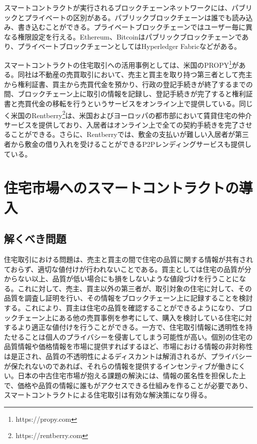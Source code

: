 \documentclass[a4paper,fontsize=11pt,report,notitlepage,line_length=38zw,number_of_lines=40]{jlreq}
\begin{document}
スマートコントラクトが実行されるブロックチェーンネットワークには、パブリックとプライベートの区別がある。パブリックブロックチェーンは誰でも読み込み、書き込むことができる。プライベートブロックチェーンではユーザー毎に異なる権限設定を行える。Ethereum、Bitcoinはパブリックブロックチェーンであり、プライベートブロックチェーンとしてはHyperledger Fabricなどがある。


スマートコントラクトの住宅取引への活用事例としては、米国のPROPY\footnote{https://propy.com}がある。同社は不動産の売買取引において、売主と買主を取り持つ第三者として売主から権利証書、買主から売買代金を預かり、行政の登記手続きが終了するまでの間、ブロックチェーン上に取引の情報を記録し、登記手続きが完了すると権利証書と売買代金の移転を行うというサービスをオンライン上で提供している。同じく米国のRentberry\footnote{https://rentberry.com}は、米国およびヨーロッパの都市部において賃貸住宅の仲介サービスを提供しており、入居者はオンライン上で全ての契約手続きを完了させることができる。さらに、Rentberryでは、敷金の支払いが難しい入居者が第三者から敷金の借り入れを受けることができるP2Pレンディングサービスも提供している。


\chapter{住宅市場へのスマートコントラクトの導入}
\section{解くべき問題}
住宅取引における問題は、売主と買主の間で住宅の品質に関する情報が共有されておらず、適切な値付けが行われないことである。買主としては住宅の品質が分からない以上、品質が低い場合にも損をしないような値段づけを行うことになる。これに対して、売主、買主以外の第三者が、取引対象の住宅に対して、その品質を調査し証明を行い、その情報をブロックチェーン上に記録することを検討する。これにより、買主は住宅の品質を確認することができるようになり、ブロックチェーン上にある他の売買事例を参考にして、購入を検討している住宅に対するより適正な値付けを行うことができる。一方で、住宅取引情報に透明性を持たせることは個人のプライバシーを侵害してしまう可能性が高い。個別の住宅の品質情報や価格情報を市場に提供すればするほど、市場における情報の非対称性は是正され、品質の不透明性によるディスカントは解消されるが、プライバシーが保たれないのであれば、それらの情報を提供するインセンティブが働きにくい。日本の中古住宅市場が抱える課題の解決には、情報の匿名性を担保した上で、価格や品質の情報に誰もがアクセスできる仕組みを作ることが必要であり、スマートコントラクトによる住宅取引は有効な解決策になり得る。
\end{document}
